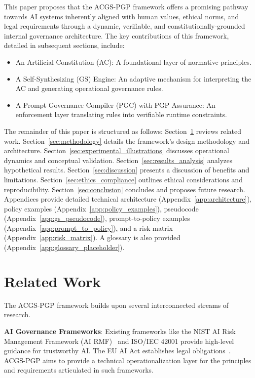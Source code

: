 \documentclass[sigconf,review,anonymous=false]{acmart} %
\begin{document}
This paper proposes that the ACGS-PGP framework offers a promising pathway towards AI systems inherently aligned with human values, ethical norms, and legal requirements through a dynamic, verifiable, and constitutionally-grounded internal governance architecture. The key contributions of this framework, detailed in subsequent sections, include:
\begin{itemize}
    \item An Artificial Constitution (AC): A foundational layer of normative principles.
    \item A Self-Synthesizing (GS) Engine: An adaptive mechanism for interpreting the AC and generating operational governance rules.
    \item A Prompt Governance Compiler (PGC) with PGP Assurance: An enforcement layer translating rules into verifiable runtime constraints.
\end{itemize}

The remainder of this paper is structured as follows: Section~\ref{sec:related_work} reviews related work. Section~\ref{sec:methodology} details the framework's design methodology and architecture. Section~\ref{sec:experimental_illustrations} discusses operational dynamics and conceptual validation. Section~\ref{sec:results_analysis} analyzes hypothetical results. Section~\ref{sec:discussion} presents a discussion of benefits and limitations. Section~\ref{sec:ethics_compliance} outlines ethical considerations and reproducibility. Section~\ref{sec:conclusion} concludes and proposes future research. Appendices provide detailed technical architecture (Appendix~\ref{app:architecture}), policy examples (Appendix~\ref{app:policy_examples}), pseudocode (Appendix~\ref{app:gs_pseudocode}), prompt-to-policy examples (Appendix~\ref{app:prompt_to_policy}), and a risk matrix (Appendix~\ref{app:risk_matrix}). A glossary is also provided (Appendix~\ref{app:glossary_placeholder}).

\section{Related Work}
\label{sec:related_work}
The ACGS-PGP framework builds upon several interconnected streams of research.

\textbf{AI Governance Frameworks}: Existing frameworks like the NIST AI Risk Management Framework (AI RMF)~\cite{NISTAIRMF23} and ISO/IEC 42001%
 provide high-level guidance for trustworthy AI. The EU AI Act establishes legal obligations~\cite{EUAIAct24}. ACGS-PGP aims to provide a technical operationalization layer for the principles and requirements articulated in such frameworks.
\end{document}
